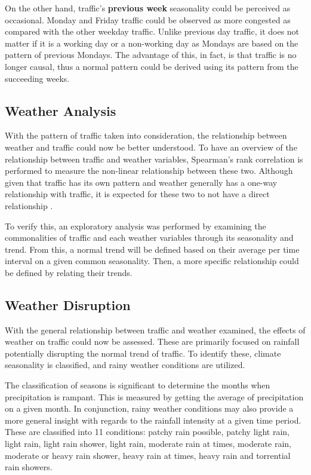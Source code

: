 On the other hand, traffic’s \textbf{previous week} seasonality could be perceived as occasional. Monday  and Friday  traffic could be observed as more congested as compared with the other weekday traffic. Unlike previous day traffic, it does not matter if it is a working day or a non-working day as Mondays are based on the pattern of previous Mondays. The advantage of this, in fact, is that traffic is no longer causal, thus a normal pattern could be derived using its pattern from the succeeding weeks.



\subsection{Weather Analysis}
With the pattern of traffic taken into consideration, the relationship between weather and traffic could now be better understood. To have an overview of the relationship between traffic and weather variables, Spearman’s rank correlation is performed to measure the non-linear relationship between these two. Although given that traffic has its own pattern and weather generally has a one-way relationship with traffic, it is expected for these two to not have a direct relationship .

To verify this, an exploratory analysis was performed by examining the commonalities of traffic and each weather variables through its seasonality and trend. From this, a normal trend will be defined based on their average per time interval on a given common seasonality. Then, a more specific relationship could be defined by relating their trends.

\subsection{Weather Disruption}
With the general relationship between traffic and weather examined, the effects of weather on traffic could now be assessed. These are primarily focused on rainfall potentially disrupting the normal trend of traffic. To identify these, climate seasonality is classified, and rainy weather conditions are utilized.

The classification of seasons is significant to determine the months when precipitation is rampant. This is measured by getting the average of precipitation on a given month. In conjunction, rainy weather conditions may also provide a more general insight with regards to the rainfall intensity at a given time period. These are classified into 11 conditions: patchy rain possible, patchy light rain, light rain, light rain shower, light rain, moderate rain at times, moderate rain, moderate or heavy rain shower, heavy rain at times, heavy rain and torrential rain showers.


